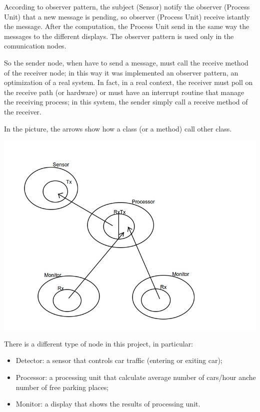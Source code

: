 \documentclass[a4paper,titlepage]{article}
\begin{document}
According to observer pattern, the subject (Sensor) notify the observer (Process Unit) that a new message is pending, so observer (Process Unit) receive istantly the message. After the computation, the Process Unit send in the same way the messages to the different displays.
The observer pattern is used only in the comunication nodes.

So the sender node, when have to send a message, must call the receive method of the receiver node; in this way it was implemented an observer pattern, an optimization of a real system. In fact, in a real context, the receiver must poll on the receive path (or hardware) or must have an interrupt routine that manage the receiving process; in this system, the sender simply call a receive method of the receiver.

In the picture, the arrows show how a class (or a method) call other class. 

    \begin{center}

    \centering
    \includegraphics[scale=0.40]{pattern.jpg}

    \end{center}


There is a different type of node in this project, in particular:

\begin{itemize}[noitemsep,topsep=20pt,parsep=10pt,partopsep=20pt]

\item Detector: a sensor that controls car traffic (entering or exiting car); 
\item Processor: a processing unit that calculate average number of cars/hour anche number of free parking places;
\item Monitor: a display that shows the results of processing unit.

\end{itemize}
\end{document}
